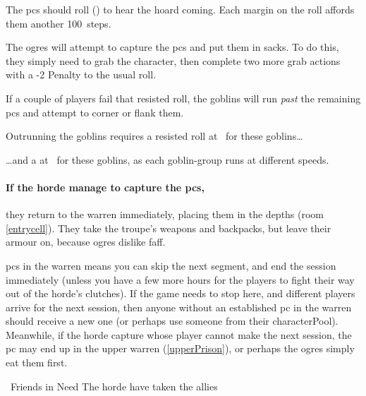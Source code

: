 The \glspl{pc} should roll  (\tn[5]) to hear the hoard coming.
Each margin on the roll affords them another 100~\glspl{step}.

\ogre

\ogre

\ogre

The \glspl{ogre} will attempt to capture the \glspl{pc} and put them in sacks.
To do this, they simply need to grab the character,%
then complete two more grab actions with a -2 Penalty to the usual roll.

If a couple of players fail that resisted  roll, the goblins will run \emph{past} the remaining \glspl{pc} and attempt to corner or flank them.%

\goblin

Outrunning the goblins requires a resisted  roll at \tn\ for these goblins\ldots

\goblin

\ldots and a  at \tn\ for these goblins, as each goblin-group runs at different speeds.

\goblin

\paragraph{If the horde manage to capture the \glspl{pc},}
they return to the \gls{warren} immediately, placing them in the depths (room \vref{entrycell}).
They take the troupe's weapons and backpacks, but leave their armour on, because \glspl{ogre} dislike faff.

\Glspl{pc} in the \gls{warren} means you can skip the next \gls{segment}, and end the session immediately (unless you have a few more hours for the players to fight their way out of the horde's clutches).
If the game needs to stop here, and different players arrive for the next session, then anyone without an established \gls{pc} in the \gls{warren} should receive a new one (or perhaps use someone from their \gls{characterPool}).
Meanwhile, if the horde capture  whose player cannot make the next session, the \gls{pc} may end up in the upper warren (\vref{upperPrison}), or perhaps the \glspl{ogre} simply eat them first.

{~Friends in Need}%
{The horde have taken the  allies}%

